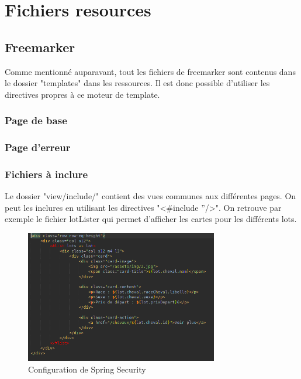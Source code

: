 	\section{Fichiers resources}

		\subsection{Freemarker}

			Comme mentionné auparavant, tout les fichiers de freemarker sont contenus dans le dossier "templates" dans les ressources. Il est donc possible d'utiliser les directives propres à ce moteur de template.

			\subsubsection{Page de base}


			\subsubsection{Page d'erreur}


			\subsubsection{Fichiers à inclure}

				Le dossier "view/include/" contient des vues communes aux différentes pages. On peut les inclures en utilisant les directives "<\#include ''/>". On retrouve par exemple le fichier lotLister qui permet d'afficher les cartes pour les différents lots.

				\begin{figure}[H]
					\centering\includegraphics[width=0.75\textwidth, keepaspectratio]{res/include-lotLister.png}
					\caption{Configuration de Spring Security}
				\end{figure}

